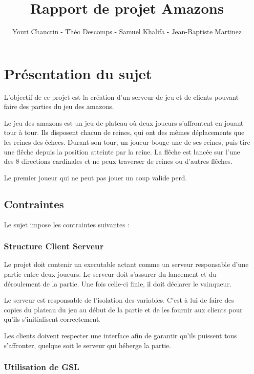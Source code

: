 \documentclass{article}
\author{Youri Chancrin - Th\'eo Descomps - Samuel Khalifa - Jean-Baptiste Martinez}
\title{Rapport de projet Amazons}
\begin{document}
\maketitle

\section{Pr\'esentation du sujet}

L'objectif de ce projet est la cr\'eation d'un serveur de jeu et de clients pouvant faire des parties 
du jeu des amazons.

Le jeu des amazons est un jeu de plateau o\`u deux joueurs s'affrontent en jouant tour \`a tour.
Ils disposent chacun de reines, qui ont des m\^emes déplacements que les reines des \'echecs.
Durant son tour, un joueur bouge une de ses reines, puis tire une fl\^eche depuis la position atteinte par la reine.
La fl\^eche est lancée sur l'une des 8 directions cardinales et ne peux traverser de reines ou d'autres fl\^eches.

Le premier joueur qui ne peut pas jouer un coup valide perd.

\subsection{Contraintes}
Le sujet impose les contraintes suivantes :

\subsubsection{Structure Client Serveur}

Le projet doit contenir un executable actant comme un serveur responsable d'une partie entre deux joueurs.
Le serveur doit s'assurer du lancement et du déroulement de la partie. Une fois celle-ci finie, 
il doit d\'eclarer le vainqueur.

Le serveur est responsable de l'isolation des variables. 
C'est \`a lui de faire des copies du plateau du jeu au d\'ebut de la partie et de les fournir aux clients 
pour qu'ils s'initialisent correctement.

Les clients doivent respecter une interface afin de garantir qu'ils puissent tous s'affronter,
quelque soit le serveur qui h\'eberge la partie.

\subsubsection{Utilisation de GSL}
\end{document}
